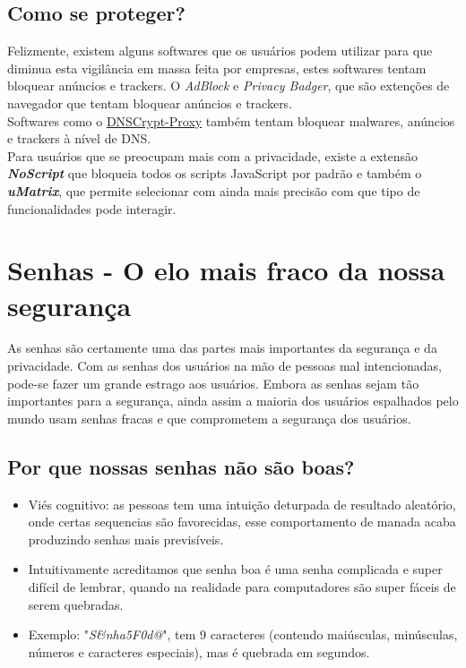\documentclass[12pt, letterpaper, Monospace:12]{report}
\begin{document}
\subsection{Como se proteger?}
	Felizmente, existem alguns softwares que os usuários podem utilizar para que diminua esta vigilância em massa feita por empresas, estes softwares tentam bloquear anúncios e trackers. O \textit{AdBlock} e \textit{Privacy Badger}, que são extenções de navegador que tentam bloquear anúncios e trackers.\\

	Softwares como o \href{https://linuxroot1.github.io/DNSCRYPT-Proxy/}{DNSCrypt-Proxy} também tentam bloquear malwares, anúncios e trackers à nível de DNS.\\

	Para usuários que se preocupam mais com a privacidade, existe a extensão \textbf{\textit{NoScript}} que bloqueia todos os scripts JavaScript por padrão e também o \textbf{\textit{uMatrix}}, que permite selecionar com ainda mais precisão com que tipo de funcionalidades pode interagir.



\section{Senhas - O elo mais fraco da nossa segurança}

As senhas são certamente uma das partes mais importantes da segurança e da privacidade. Com as senhas dos usuários na mão de pessoas mal intencionadas, pode-se fazer um grande estrago aos usuários. Embora as senhas sejam tão importantes para a segurança, ainda assim a maioria dos usuários espalhados pelo mundo usam senhas fracas e que comprometem a segurança dos usuários.\\

\subsection{Por que nossas senhas não são boas?}

\begin{itemize}
	\item Viés cognitivo: as pessoas tem uma intuição deturpada de resultado aleatório, onde certas sequencias são favorecidas, esse comportamento de manada acaba produzindo senhas mais previsíveis.
	\item Intuitivamente acreditamos que senha boa é uma senha complicada e super difícil de lembrar, quando na realidade para computadores são super fáceis de serem quebradas.
	\item Exemplo: "\textit{S\&nha5F0d@}", tem 9 caracteres (contendo maiúsculas, minúsculas, números e caracteres especiais), mas é quebrada em segundos.
\end{itemize}
\end{document}
